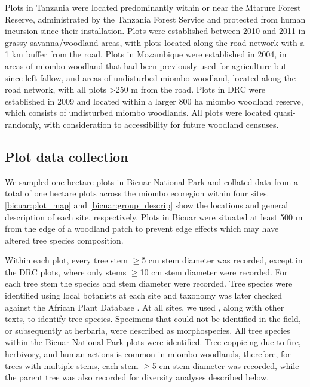\begin{refsection}
Plots in Tanzania were located predominantly within or near the Mtarure Forest Reserve, administrated by the Tanzania Forest Service and protected from human incursion since their installation. Plots were established between 2010 and 2011 in grassy savanna/woodland areas, with plots located along the road network with a 1 km buffer from the road. Plots in Mozambique were established in 2004, in areas of miombo woodland that had been previously used for agriculture but since left fallow, and areas of undisturbed miombo woodland, located along the road network, with all plots >250 m from the road. Plots in DRC were established in 2009 and located within a larger 800 ha miombo woodland reserve, which consists of undisturbed miombo woodlands. All plots were located quasi-randomly, with consideration to accessibility for future woodland censuses.

\subsection{Plot data collection}
\label{bicuar:ssec:plot_data}

We sampled \nplotsbicuar{} one hectare plots in Bicuar National Park and collated data from a total of \nplots{} one hectare plots across the miombo ecoregion within four sites. \autoref{bicuar:plot_map} and \autoref{bicuar:group_descrip} show the locations and general description of each site, respectively. Plots in Bicuar were situated at least 500 m from the edge of a woodland patch to prevent edge effects which may have altered tree species composition.

Within each plot, every tree stem $\ge$5 cm stem diameter was recorded, except in the DRC plots, where only stems $\ge$10 cm stem diameter were recorded. For each tree stem the species and stem diameter were recorded. Tree species were identified using local botanists at each site and taxonomy was later checked against the African Plant Database \citep{APD2020}. At all sites, we used \citet{Palgrave2003}, along with other texts, to identify tree species. Specimens that could not be identified in the field, or subsequently at herbaria, were described as morphospecies. All tree species within the Bicuar National Park plots were identified. Tree coppicing due to fire, herbivory, and human actions is common in miombo woodlands, therefore, for trees with multiple stems, each stem $\ge$5 cm stem diameter was recorded, while the parent tree was also recorded for diversity analyses described below.   


\end{refsection}
